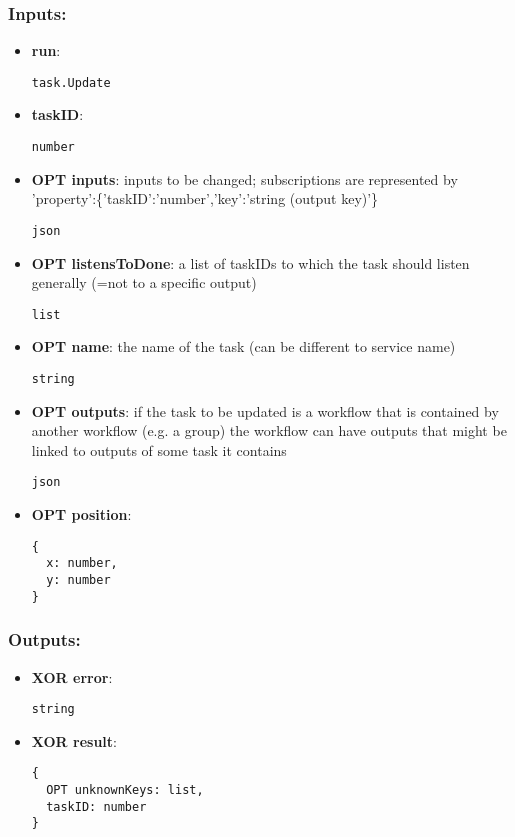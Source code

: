 \subsubsection*{Inputs:}
\begin{itemize}
    \item \textbf{run}: 
\begin{lstlisting}
task.Update
\end{lstlisting}
    \item \textbf{taskID}: 
\begin{lstlisting}
number
\end{lstlisting}
    \item \textbf{OPT inputs}: inputs to be changed; subscriptions are represented by 'property':\{'taskID':'number','key':'string (output key)'\}
\begin{lstlisting}
json
\end{lstlisting}
    \item \textbf{OPT listensToDone}: a list of taskIDs to which the task should listen generally (=not to a specific output)
\begin{lstlisting}
list
\end{lstlisting}
    \item \textbf{OPT name}: the name of the task (can be different to service name)
\begin{lstlisting}
string
\end{lstlisting}
    \item \textbf{OPT outputs}: if the task to be updated is a workflow that is contained by another  workflow (e.g. a group) the workflow can have outputs that might be  linked to outputs of some task it contains
\begin{lstlisting}
json
\end{lstlisting}
    \item \textbf{OPT position}: 
\begin{lstlisting}
{
  x: number, 
  y: number
}
\end{lstlisting}
  \end{itemize}

\subsubsection*{Outputs:}
\begin{itemize}
    \item \textbf{XOR error}: 
\begin{lstlisting}
string
\end{lstlisting}
    \item \textbf{XOR result}: 
\begin{lstlisting}
{
  OPT unknownKeys: list, 
  taskID: number
}
\end{lstlisting}
  \end{itemize}

